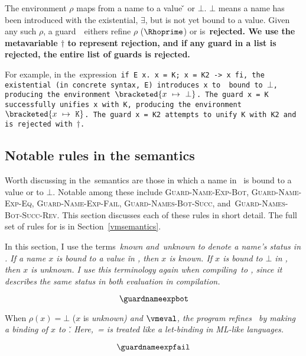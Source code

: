\documentclass[manuscript,screen 12pt, nonacm]{acmart}
\begin{document}


The environment $\rho$ maps from a name to a value {\v} or $\bot$. $\bot$ means
a name has been introduced with the existential, $\exists$, but is not yet bound
to a value. Given any such $\rho$, a guard~\g\ eithers refine $\rho$
($\Rhoprime$) or is~\bf{rejected}. We use the metavariable $\dagger$ to
represent rejection, and if any guard in a list is rejected, the entire list of
guards is rejected.

    \gfail

  For example, in the~\VMinus expression~\tt{if E x. x = K; x = K2 -> x fi}, the
  existential (in concrete syntax,~\tt{E}) introduces~\tt{x} to~\Rho\ bound to
  $\bot$, producing the environment $\bracketed{x~\mapsto~\bot}$. The guard
  \tt{x = K} successfully unifies~\tt{x} with~\tt{K}, producing the environment
  $\bracketed{x~\mapsto~\tt{K}}$. The guard~\tt{x = K2} attempts to unify~\tt{K}
  with~\tt{K2} and is rejected with $\dagger$. 

  \subsection{Notable rules in the \VMinus semantics}

  Worth discussing in the~\VMinus semantics are those in which a name in \Rho\
  is bound to a value or to $\bot$. Notable among these include
  \textsc{Guard-Name-Exp-Bot}, \textsc{Guard-Name-Exp-Eq},
  \textsc{Guard-Name-Exp-Fail}, \textsc{Guard-Names-Bot-Succ},
  and~\textsc{Guard-Names-Bot-Succ-Rev}. This section discusses each of these
  rules in short detail. The full set of rules for \VMinus is in
  Section~\ref{vmsemantics}. 

  In this section, I use the terms~\it{known} and~\it{unknown} to denote a
  name's status in \Rho. If a name $x$ is bound to a value \v in \Rho, then $x$
  is \it{known}. If $x$ is bound to $\bot$ in \Rho, then $x$ is \it{unknown}. I
  use this terminology again when compiling~\VMinus to \D, since it describes
  the same status in both evaluation in compilation. 

\[
\guardnameexpbot
\]

When $\rho(x) = \bot$ ($x$ is \it{unknown}) and $\vmeval$, the program refines
\Rho\ by making a binding of $x$ to \v. Here,~\it{=} is treated like a
let-binding in ML-like languages. 

\[
  \guardnameexpfail
\]
  
\end{document}
